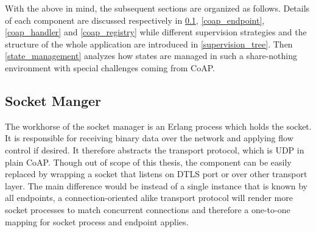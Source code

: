With the above in mind, the subsequent sections are organized as follows. Details of each component are discussed respectively in \ref{socket_manager}, \ref{coap_endpoint}, \ref{coap_handler} and \ref{coap_registry} while different supervision strategies and the structure of the whole application are introduced in \ref{supervision_tree}. Then \ref{state_management} analyzes how states are managed in such a share-nothing environment with special challenges coming from CoAP. 

\begin{figure}
\label{fig:ecoap_arch_logic}
\end{figure}

\subsection{Socket Manger}\label{socket_manager}

The workhorse of the socket manager is an Erlang process which holds the socket. It is responsible for receiving binary data over the network and applying flow control if desired. It therefore abstracts the transport protocol, which is UDP in plain CoAP. Though out of scope of this thesis, the component can be easily replaced by wrapping a socket that listens on DTLS port or over other transport layer. The main difference would be instead of a single instance that is known by all endpoints, a connection-oriented alike transport protocol will render more socket processes to match concurrent connections and therefore a one-to-one mapping for socket process and endpoint applies. 

